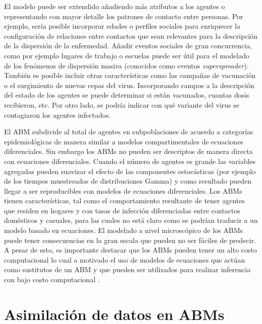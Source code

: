 El modelo puede ser extendido añadiendo más atributos a los agentes o representando con mayor detalle los patrones de contacto entre personas. Por ejemplo, sería posible incorporar edades o perfiles sociales para enriquecer la configuración de relaciones entre contactos que sean relevantes para la descripción de la dispersión de la enfermedad. Añadir eventos sociales de gran concurrencia, como por ejemplo lugares de trabajo o escuelas puede ser útil para el modelado de los fenómenos de dispersión masiva (conocidos como eventos \textit{superspreader}). También es posible incluir otras características como las campañas de vacunación o el surgimiento de nuevas cepas del virus. Incorporando campos a la descripción del estado de los agentes se puede determinar si están vacunados, cuantas dosis recibieron, etc. Por otro lado, se podría indicar con qué variante del virus se contagiaron los agentes infectados.

El ABM subdivide al total de agentes en subpoblaciones de acuerdo a categorías epidemiológicas de manera similar a modelos compartimentales de ecuaciones diferenciales. Sin embargo los ABMs no pueden ser descriptos de manera directa con ecuaciones diferenciales. Cuando el número de agentes es grande las variables agregadas pueden suavizar el efecto de las componentes estocásticas (por ejemplo de los tiempos muestreados de distribuciones Gamma) y como resultado pueden llegar a ser reproducibles con modelos de ecuaciones diferenciales. Los ABMs tienen características, tal como el comportamiento resultante de tener agentes que residen en hogares y con tasas de infección diferenciadas entre contactos domésticos y casuales, para las cuales no está claro como se podrían traducir a un modelo basado en ecuaciones. El modelado a nivel microscópico de los ABMs puede tener consecuencias en la gran escala que pueden no ser fáciles de predecir. A pesar de esto, es importante destacar que los ABMs pueden tener un alto costo computacional lo cual a motivado el uso de modelos de ecuaciones que actúan como sustitutos de un ABM y que pueden ser utilizados para realizar inferencia con bajo costo computacional \citep{Hooten2020}.

\section{Asimilación de datos en ABMs}

